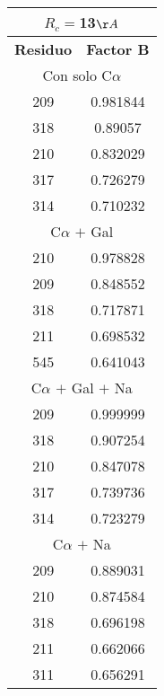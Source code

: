 \begin{tabular}[c]{|c|c|}
\multicolumn{2}{c}{$R_c=$13$\AA$}\\\hline
\textbf{Residuo}&\textbf{Factor B}\\\hline
\multicolumn{2}{c}{Con solo C$\alpha$}\\\hline
       209&  0.981844\\
       318&   0.89057\\
       210&  0.832029\\
       317&  0.726279\\
       314&  0.710232\\
\hline
\multicolumn{2}{c}{C$\alpha$ $+$ Gal}\\\hline
       210&  0.978828\\
       209&  0.848552\\
       318&  0.717871\\
       211&  0.698532\\
       545&  0.641043\\
\hline
\multicolumn{2}{c}{C$\alpha$ $+$ Gal $+$ Na}\\\hline
       209&  0.999999\\
       318&  0.907254\\
       210&  0.847078\\
       317&  0.739736\\
       314&  0.723279\\
\hline
\multicolumn{2}{c}{C$\alpha$ $+$ Na}\\\hline
       209&  0.889031\\
       210&  0.874584\\
       318&  0.696198\\
       211&  0.662066\\
       311&  0.656291\\
\hline
\end{tabular}
